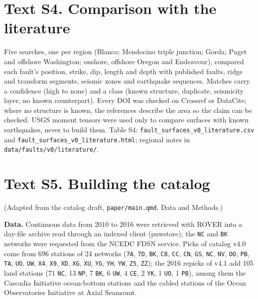 \documentclass[11pt]{article}
\begin{document}
\section{Text S4. Comparison with the
literature}\label{text-s4.-comparison-with-the-literature}

Five searches, one per region (Blanco; Mendocino triple junction; Gorda;
Puget and offshore Washington; onshore, offshore Oregon and Endeavour),
compared each fault's position, strike, dip, length and depth with
published faults, ridge and transform segments, seismic zones and
earthquake sequences. Matches carry a confidence (high to none) and a
class (known structure, duplicate, seismicity layer, no known
counterpart). Every DOI was checked on Crossref or DataCite; where no
structure is known, the references describe the area so the claim can be
checked. USGS moment tensors were used only to compare surfaces with
known earthquakes, never to build them. Table S4:
\texttt{fault\_surfaces\_v0\_literature.csv} and
\texttt{fault\_surfaces\_v0\_literature.html}; regional notes in
\texttt{data/faults/v0/literature/}.

\section{Text S5. Building the
catalog}\label{text-s5.-building-the-catalog}

(Adapted from the catalog draft, \texttt{paper/main.qmd}, Data and
Methods.)

\textbf{Data.} Continuous data from 2010 to 2016 were retrieved with
ROVER into a day-file archive read through an indexed client (pnwstore);
the \texttt{NC} and \texttt{BK} networks were requested from the NCEDC
FDSN service. Picks of catalog v4.0 come from 696 stations of 24
networks (\texttt{7A}, \texttt{7D}, \texttt{BK}, \texttt{C8},
\texttt{CC}, \texttt{CN}, \texttt{GS}, \texttt{NC}, \texttt{NV},
\texttt{OO}, \texttt{PB}, \texttt{TA}, \texttt{UO}, \texttt{UW},
\texttt{X4}, \texttt{X9}, \texttt{XD}, \texttt{XG}, \texttt{XU},
\texttt{YG}, \texttt{YH}, \texttt{YW}, \texttt{Z5}, \texttt{ZZ}); the
2016 repicks of v4.1 add 105 land stations (71 \texttt{NC}, 13
\texttt{NP}, 7 \texttt{BK}, 6 \texttt{UW}, 4 \texttt{CE}, 2 \texttt{YK},
1 \texttt{UO}, 1 \texttt{PB}), among them the Cascadia Initiative
ocean-bottom stations \citep{Stone2018} and the cabled stations of the
Ocean Observatories Initiative at Axial Seamount.
\end{document}
